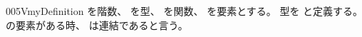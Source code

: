 \documentclass[index]{subfiles}
\begin{document}
\begin{myBlock}{005V}{myDefinition}
  を階数、
  を型、
  を関数、
  を要素とする。
  型を
  と定義する。
  の要素がある時、
  は連結であると言う。
\end{myBlock}
\end{document}
